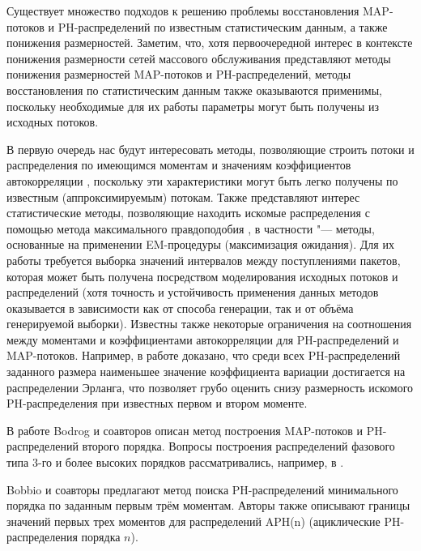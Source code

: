 Существует множество подходов к решению проблемы восстановления MAP-потоков и PH-распределений по известным статистическим данным, а также понижения размерностей. Заметим, что, хотя первоочередной интерес в контексте понижения размерности сетей массового обслуживания представляют методы понижения размерностей MAP-потоков и PH-распределений, методы восстановления по статистическим данным также оказываются применимы, поскольку необходимые для их работы параметры могут быть получены из исходных потоков.

В первую очередь нас будут интересовать методы, позволяющие строить потоки и распределения по имеющимся моментам и значениям коэффициентов автокорреляции \cite{2005-Horvath_Buccholz_Telek}, поскольку эти характеристики могут быть легко получены по известным (аппроксимируемым) потокам. Также представляют интерес статистические методы, позволяющие находить искомые распределения с помощью метода максимального правдоподобия \cite{2013_Horvath_Okamura,2009_Okamura_Dohi,2005_Thummler_Buchholz_Telek}, в частности "--- методы, основанные на применении EM-процедуры (максимизация ожидания). Для их работы требуется выборка значений интервалов между поступлениями пакетов, которая может быть получена посредством моделирования исходных потоков и распределений (хотя точность и устойчивость применения данных методов оказывается в зависимости как от способа генерации, так и от объёма генерируемой выборки). Известны также некоторые ограничения на соотношения между моментами и коэффициентами автокорреляции для PH-распределений и MAP-потоков. Например, в работе \cite{1987-Aldous-Shepp} доказано, что среди всех PH-распределений заданного размера наименьшее значение коэффициента вариации достигается на распределении Эрланга, что позволяет грубо оценить снизу размерность искомого PH-распределения при известных первом и втором моменте.

В работе Bodrog и соавторов \cite{2008-Bodrog-Heindl-Horvath-Telek} описан метод построения MAP-потоков и PH-распределений второго порядка. Вопросы построения распределений фазового типа 3-го и более высоких порядков рассматривались, например, в \cite{2005-Bobbio-Horvath-Telek, 2016-Horvath-etal, 2007-Horvath-Telek}.

Bobbio и соавторы \cite{2005-Bobbio-Horvath-Telek} предлагают метод поиска PH-распределений минимального порядка по заданным первым трём моментам. Авторы также описывают границы значений первых трех моментов для распределений APH(n) (ациклические PH-распределения порядка $n$).

